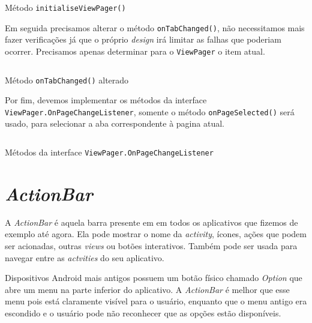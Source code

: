 \documentclass[a4paper,12pt,brazil,oneside]{book}
\begin{document}
	\begin{listing}[H]
	\inputminted[linenos=true,fontsize=\small,frame=lines, framesep=2mm, tabsize=2,numbersep=5pt]{java}{src/design/initialiseviewpager.java}
	\caption{Método \texttt{initialiseViewPager()}}
	\end{listing}
	
	Em seguida precisamos alterar o método \texttt{onTabChanged()}, não necessitamos mais fazer verificações já que o próprio \emph{design} irá limitar as falhas que poderiam ocorrer. Precisamos apenas determinar para o \texttt{ViewPager} o item atual. 
	
	\begin{listing}[H]
	\inputminted[linenos=true,fontsize=\small,frame=lines, framesep=2mm, tabsize=2,numbersep=5pt]{java}{src/design/ontabchanged-swipe.java}
	\caption{Método \texttt{onTabChanged()} alterado}
	\end{listing}
	
	Por fim, devemos implementar os métodos da interface \\ \texttt{ViewPager.OnPageChangeListener}, somente o método \texttt{onPageSelected()} será usado, para selecionar a aba correspondente à pagina atual.
	
	\begin{listing}[H]
	\inputminted[linenos=true,fontsize=\small,frame=lines, framesep=2mm, tabsize=2,numbersep=5pt]{java}{src/design/vpinterface.java}
	\caption{Métodos da interface \texttt{ViewPager.OnPageChangeListener}}
	\end{listing}
		
\section{\emph{ActionBar}}

	A \emph{ActionBar} é aquela barra presente em em todos os aplicativos que fizemos de exemplo até agora. Ela pode mostrar o nome da \emph{activity}, ícones, ações que podem ser acionadas, outras \emph{views} ou botões interativos. Também pode ser usada para navegar entre as \emph{actvities} do seu aplicativo.
	
	Dispositivos Android mais antigos possuem um botão físico chamado \emph{Option} que abre um menu na parte inferior do aplicativo. A \emph{ActionBar} é melhor que esse menu pois está claramente visível para o usuário, enquanto que o menu antigo era escondido e o usuário pode não reconhecer que as opções estão disponíveis.
	
\end{document}
